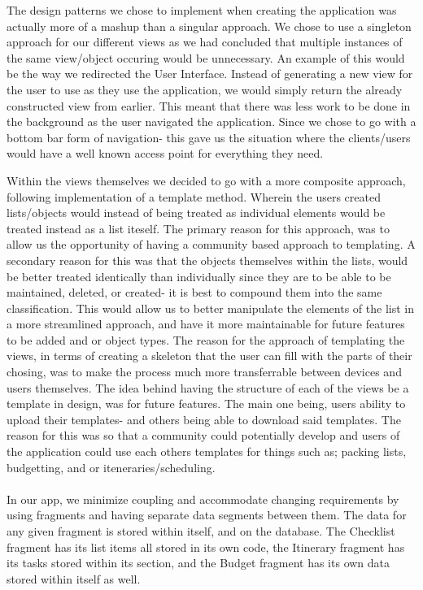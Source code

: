 \documentclass[12pt]{article}
\begin{document}
	The design patterns we chose to implement when creating the application was actually more of a mashup than a singular approach. We chose to use a singleton approach
	for our different views as we had concluded that multiple instances of the same view/object occuring would be unnecessary. An example of this would be the way we redirected
	the User Interface. Instead of generating a new view for the user to use as they use the application, we would simply return the already constructed view from earlier.
	This meant that there was less work to be done in the background as the user navigated the application. Since we chose to go with a bottom bar form of navigation-
	this gave us the situation where the clients/users would have a well known access point for everything they need.

	Within the views themselves we decided to go with a more composite approach, following implementation of a template method. Wherein the users created lists/objects would instead of being treated as
	individual elements would be treated instead as a list iteself. The primary reason for this approach, was to allow us the opportunity of having a community based approach to templating.
	A secondary reason for this was that the objects themselves within the lists, would be better treated identically than individually since they are to be able to be maintained,
	deleted, or created- it is best to compound them into the same classification. This would allow us to better manipulate the elements of the list in a more streamlined approach,
	and have it more maintainable for future features to be added and or object types. The reason for the approach of templating the views, in terms of creating a skeleton that the user can
	fill with the parts of their chosing, was to make the process much more transferrable between devices and users themselves. The idea behind having the structure of each of the views
	be a template in design, was for future features. The main one being, users ability to upload their templates- and others being able to download said templates. The reason for this was
	so that a community could potentially develop and users of the application could use each others templates for things such as; packing lists, budgetting, and or iteneraries/scheduling.\\
	\\

	In our app, we minimize coupling and accommodate changing requirements by using fragments and having separate data segments between them.
	The data for any given fragment is stored within itself, and on the database.
	The Checklist fragment has its list items all stored in its own code, the Itinerary fragment has its tasks stored within its section, and the Budget fragment has its own data stored within itself as well.\\
\end{document}
